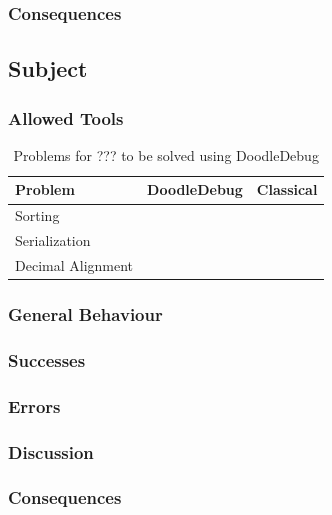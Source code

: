 \documentclass[a4paper,ngerman,english]{amsbook} %
\begin{document}
\subsubsection{Consequences}

\subsection{Subject}
\subsubsection{Allowed Tools}
\begin{table}[h]
\centering
\begin{tabular}{l c c}
{\bf Problem} & {\bf DoodleDebug} & {\bf Classical} \\ \hline
Sorting &  &  \\
Serialization &  &  \\
Decimal Alignment &  &  \\
\end{tabular}
\caption{Problems for ??? to be solved using DoodleDebug}
\end{table}
\subsubsection{General Behaviour}
\subsubsection{Successes}
\subsubsection{Errors}
\subsubsection{Discussion}
\subsubsection{Consequences}
\end{document}
